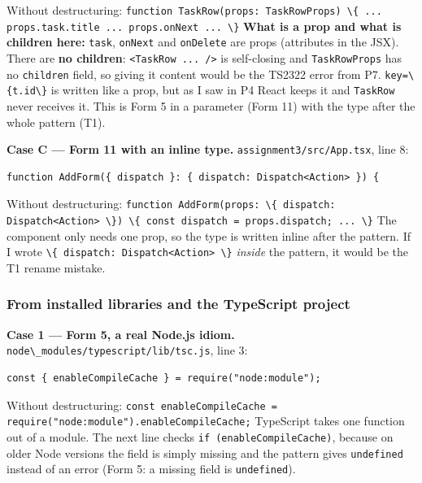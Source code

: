 \documentclass[
  10pt,
]{article}
\newcommand{\passthrough}[1]{#1}
\begin{document}
Without destructuring:
\passthrough{\lstinline!function TaskRow(props: TaskRowProps) \{ ... props.task.title ... props.onNext ... \}!}
\textbf{What is a prop and what is children here:}
\passthrough{\lstinline!task!}, \passthrough{\lstinline!onNext!} and
\passthrough{\lstinline!onDelete!} are props (attributes in the JSX).
There are \textbf{no children}:
\passthrough{\lstinline!<TaskRow ... />!} is self-closing and
\passthrough{\lstinline!TaskRowProps!} has no
\passthrough{\lstinline!children!} field, so giving it content would be
the TS2322 error from P7. \passthrough{\lstinline!key=\{t.id\}!} is
written like a prop, but as I saw in P4 React keeps it and
\passthrough{\lstinline!TaskRow!} never receives it. This is Form 5 in a
parameter (Form 11) with the type after the whole pattern (T1).

\textbf{Case C --- Form 11 with an inline type.}
\passthrough{\lstinline!assignment3/src/App.tsx!}, line 8:

\begin{lstlisting}
function AddForm({ dispatch }: { dispatch: Dispatch<Action> }) {
\end{lstlisting}

Without destructuring:
\passthrough{\lstinline!function AddForm(props: \{ dispatch: Dispatch<Action> \}) \{ const dispatch = props.dispatch; ... \}!}
The component only needs one prop, so the type is written inline after
the pattern. If I wrote
\passthrough{\lstinline!\{ dispatch: Dispatch<Action> \}!} \emph{inside}
the pattern, it would be the T1 rename mistake.

\hypertarget{from-installed-libraries-and-the-typescript-project}{%
\subsubsection{From installed libraries and the TypeScript
project}\label{from-installed-libraries-and-the-typescript-project}}

\textbf{Case 1 --- Form 5, a real Node.js idiom.}
\passthrough{\lstinline!node\_modules/typescript/lib/tsc.js!}, line 3:

\begin{lstlisting}
const { enableCompileCache } = require("node:module");
\end{lstlisting}

Without destructuring:
\passthrough{\lstinline!const enableCompileCache = require("node:module").enableCompileCache;!}
TypeScript takes one function out of a module. The next line checks
\passthrough{\lstinline!if (enableCompileCache)!}, because on older Node
versions the field is simply missing and the pattern gives
\passthrough{\lstinline!undefined!} instead of an error (Form 5: a
missing field is \passthrough{\lstinline!undefined!}).
\end{document}
